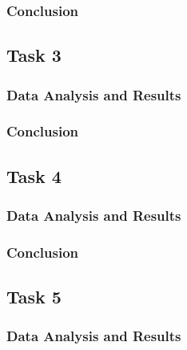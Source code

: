 \documentclass[a4paper]{article}
\begin{document}
\subsubsection{Conclusion}

\subsection{Task 3}

\subsubsection{Data Analysis and Results}

\subsubsection{Conclusion}

\subsection{Task 4}

\subsubsection{Data Analysis and Results}

\subsubsection{Conclusion}

\subsection{Task 5}

\subsubsection{Data Analysis and Results}
\end{document}
